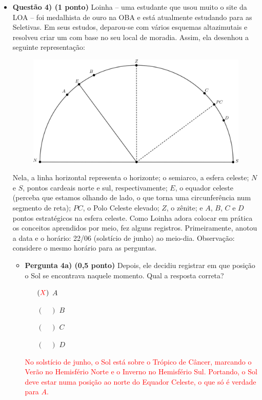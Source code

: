 \documentclass[a4paper, 12pt]{article}
\begin{document}
\begin{flushleft}
\begin{itemize}
		\item \textbf{Questão 4) (1 ponto)} Loinha -- uma estudante que usou muito o site da LOA -- foi medalhista de ouro na OBA e está atualmente estudando para as Seletivas. Em seus estudos, deparou-se com vários esquemas altazimutais e resolveu criar um com base no seu local de moradia. Assim, ela desenhou a seguinte representação:
			\begin{figure}[H]
				\centering
				\includegraphics[scale=1.2]{./img/4.png}
			\end{figure}
			Nela, a linha horizontal representa o horizonte; o semiarco, a esfera celeste; $N$ e $S$, pontos cardeais norte e sul, respectivamente; $E$, o equador celeste (perceba que estamos olhando de lado, o que torna uma circunferência num segmento de reta); $PC$, o Polo Celeste elevado; $Z$, o zênite; e $A$, $B$, $C$ e $D$ pontos estratégicos na esfera celeste. \linebreak
			Como Loinha adora colocar em prática os conceitos aprendidos por meio, fez alguns registros. Primeiramente, anotou a data e o horário: 22/06 (solstício de junho) ao meio-dia.\linebreak
			Observação: considere o mesmo horário para as perguntas.
			\begin{itemize}
				\item \textbf{Pergunta 4a) (0,5 ponto)} Depois, ele decidiu registrar em que posição o Sol se encontrava naquele momento. Qual a resposta correta?
					\begin{itemize}
						\item[$(\textcolor{red}{X})$] $A$
						\item[$(\quad)$] $B$
						\item[$(\quad)$] $C$
						\item[$(\quad)$] $D$
					\end{itemize}
					\textcolor{red}{No solstício de junho, o Sol está sobre o Trópico de Câncer, marcando o Verão no Hemisfério Norte e o Inverno no Hemisfério Sul. Portando, o Sol deve estar numa posição ao norte do Equador Celeste, o que só é verdade para $A$.}
					

\end{itemize}
\end{itemize}
\end{flushleft}
\end{document}
